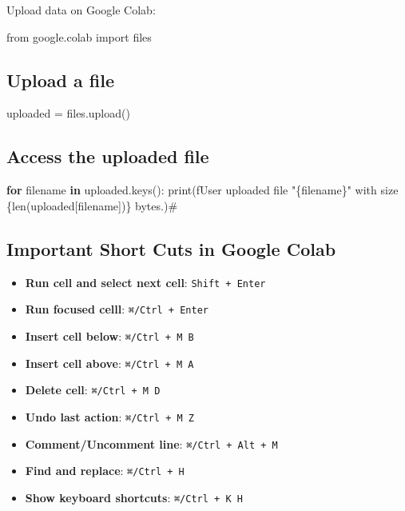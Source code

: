 \documentclass[
  letterpaper,
  DIV=11,
  numbers=noendperiod]{scrreprt}
\newenvironment{Shaded}{\begin{snugshade}}{\end{snugshade}}
\newcommand{\BuiltInTok}[1]{\textcolor[rgb]{0.00,0.23,0.31}{#1}}
\newcommand{\CommentTok}[1]{\textcolor[rgb]{0.37,0.37,0.37}{#1}}
\newcommand{\ControlFlowTok}[1]{\textcolor[rgb]{0.00,0.23,0.31}{\textbf{#1}}}
\newcommand{\ImportTok}[1]{\textcolor[rgb]{0.00,0.46,0.62}{#1}}
\newcommand{\KeywordTok}[1]{\textcolor[rgb]{0.00,0.23,0.31}{\textbf{#1}}}
\newcommand{\NormalTok}[1]{\textcolor[rgb]{0.00,0.23,0.31}{#1}}
\newcommand{\OperatorTok}[1]{\textcolor[rgb]{0.37,0.37,0.37}{#1}}
\newcommand{\SpecialCharTok}[1]{\textcolor[rgb]{0.37,0.37,0.37}{#1}}
\newcommand{\SpecialStringTok}[1]{\textcolor[rgb]{0.13,0.47,0.30}{#1}}
\providecommand{\tightlist}{%
  \setlength{\itemsep}{0pt}\setlength{\parskip}{0pt}}\usepackage{longtable,booktabs,array}
\begin{document}
Upload data on Google Colab:

\begin{Shaded}
\begin{Highlighting}[]
\ImportTok{from}\NormalTok{ google.colab }\ImportTok{import}\NormalTok{ files}
\end{Highlighting}
\end{Shaded}

\subsection{Upload a file}\label{upload-a-file}

\begin{Shaded}
\begin{Highlighting}[]
\NormalTok{uploaded }\OperatorTok{=}\NormalTok{ files.upload()}
\end{Highlighting}
\end{Shaded}

\subsection{Access the uploaded file}\label{access-the-uploaded-file}

\begin{Shaded}
\begin{Highlighting}[]
\ControlFlowTok{for}\NormalTok{ filename }\KeywordTok{in}\NormalTok{ uploaded.keys():}
    \BuiltInTok{print}\NormalTok{(}\SpecialStringTok{f\textquotesingle{}User uploaded file "}\SpecialCharTok{\{}\NormalTok{filename}\SpecialCharTok{\}}\SpecialStringTok{" with size }\SpecialCharTok{\{}\BuiltInTok{len}\NormalTok{(uploaded[filename])}\SpecialCharTok{\}}\SpecialStringTok{ bytes.\textquotesingle{}}\NormalTok{)}\CommentTok{\#}
\end{Highlighting}
\end{Shaded}

\subsection{Important Short Cuts in Google
Colab}\label{important-short-cuts-in-google-colab}

\begin{itemize}
\tightlist
\item
  \textbf{Run cell and select next cell}: \texttt{Shift\ +\ Enter}
\item
  \textbf{Run focused celll}: \texttt{⌘/Ctrl\ +\ Enter}
\item
  \textbf{Insert cell below}: \texttt{⌘/Ctrl\ +\ M\ B}
\item
  \textbf{Insert cell above}: \texttt{⌘/Ctrl\ +\ M\ A}
\item
  \textbf{Delete cell}: \texttt{⌘/Ctrl\ +\ M\ D}
\item
  \textbf{Undo last action}: \texttt{⌘/Ctrl\ +\ M\ Z}
\item
  \textbf{Comment/Uncomment line}: \texttt{⌘/Ctrl\ +\ Alt\ +\ M}
\item
  \textbf{Find and replace}: \texttt{⌘/Ctrl\ +\ H}
\item
  \textbf{Show keyboard shortcuts}: \texttt{⌘/Ctrl\ +\ K\ H}
\end{itemize}
\end{document}
